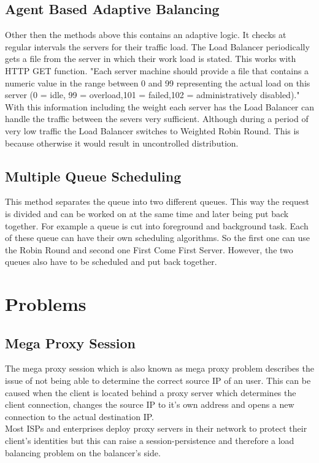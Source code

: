 \documentclass[12p]{article}
\begin{document}
	\subsection{Agent Based Adaptive Balancing}
	Other then the methods above this contains an adaptive logic. It checks at regular intervals the servers for their traffic load. The Load Balancer periodically gets a file from the server in which their work load is stated. This works with HTTP GET function. "Each server machine should  provide a file that contains a numeric value in the range between 0 and 99 representing the  actual load on this server (0 = idle, 99 = overload,101 = failed,102 = administratively disabled)."\cite{schedu} With this information  including the weight each server has the Load Balancer can handle the traffic between the severs very sufficient. Although during a period of very low traffic the Load Balancer switches to Weighted Robin Round. This is because otherwise it would result in uncontrolled distribution.
	
	\subsection{Multiple Queue Scheduling}
	This method separates the queue into two different queues. This way the request is divided and can be worked on at the same time and later being put back together. For example a queue is cut into foreground and background task. Each of these queue can have their own scheduling algorithms. So the first one can use the Robin Round and second one First Come First Server. However, the two queues also have to be scheduled and put back together. 
	
	\newpage
	\section{Problems}
	\subsection{Mega Proxy Session}
	The mega proxy session which is also known as mega proxy problem describes the issue of not being able to determine the correct source IP of an user. This can be caused when the client is located behind a proxy server which determines the client connection, changes the source IP to it's own address and opens a new connection to the actual destination IP.\\
	Most ISPs and enterprises deploy proxy servers in their network to protect their client's identities but this can raise a session-persistence and therefore a load balancing problem on the balancer's side.\\
	
\end{document}
